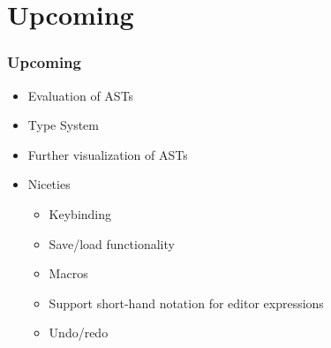 \documentclass{beamer}
\begin{document}
\section{Upcoming}

\begin{frame}
    \frametitle{Upcoming}

    \begin{itemize}
        \item Evaluation of ASTs
            \pause
        \item Type System
            \pause
        \item Further visualization of ASTs
            \pause
        \item Niceties
        \begin{itemize}
            \item Keybinding
                \pause
            \item Save/load functionality
                \pause
            \item Macros
                \pause
            \item Support short-hand notation for editor expressions
                \pause
            \item Undo/redo
        \end{itemize}
    \end{itemize}
\end{frame}

\begin{frame}
    \centering
\end{frame}
\end{document}
